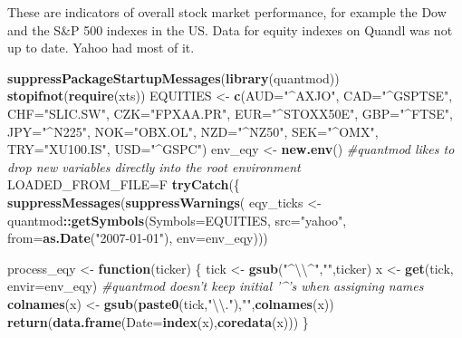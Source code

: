 \documentclass[]{article}
\newenvironment{Shaded}{\begin{snugshade}}{\end{snugshade}}
\newcommand{\KeywordTok}[1]{\textcolor[rgb]{0.13,0.29,0.53}{\textbf{#1}}}
\newcommand{\DataTypeTok}[1]{\textcolor[rgb]{0.13,0.29,0.53}{#1}}
\newcommand{\CharTok}[1]{\textcolor[rgb]{0.31,0.60,0.02}{#1}}
\newcommand{\StringTok}[1]{\textcolor[rgb]{0.31,0.60,0.02}{#1}}
\newcommand{\CommentTok}[1]{\textcolor[rgb]{0.56,0.35,0.01}{\textit{#1}}}
\newcommand{\ControlFlowTok}[1]{\textcolor[rgb]{0.13,0.29,0.53}{\textbf{#1}}}
\newcommand{\OperatorTok}[1]{\textcolor[rgb]{0.81,0.36,0.00}{\textbf{#1}}}
\newcommand{\NormalTok}[1]{#1}
\begin{document}
These are indicators of overall stock market performance, for example
the Dow and the S\&P 500 indexes in the US. Data for equity indexes on
Quandl was not up to date. Yahoo had most of it.

\begin{Shaded}
\begin{Highlighting}[]
\KeywordTok{suppressPackageStartupMessages}\NormalTok{(}\KeywordTok{library}\NormalTok{(quantmod))}
\KeywordTok{stopifnot}\NormalTok{(}\KeywordTok{require}\NormalTok{(xts))}
\NormalTok{EQUITIES <-}\StringTok{ }\KeywordTok{c}\NormalTok{(}\DataTypeTok{AUD=}\StringTok{"^AXJO"}\NormalTok{, }\DataTypeTok{CAD=}\StringTok{"^GSPTSE"}\NormalTok{, }\DataTypeTok{CHF=}\StringTok{"SLIC.SW"}\NormalTok{, }\DataTypeTok{CZK=}\StringTok{"FPXAA.PR"}\NormalTok{, }\DataTypeTok{EUR=}\StringTok{"^STOXX50E"}\NormalTok{,}
              \DataTypeTok{GBP=}\StringTok{"^FTSE"}\NormalTok{, }\DataTypeTok{JPY=}\StringTok{"^N225"}\NormalTok{, }\DataTypeTok{NOK=}\StringTok{"OBX.OL"}\NormalTok{, }\DataTypeTok{NZD=}\StringTok{"^NZ50"}\NormalTok{, }\DataTypeTok{SEK=}\StringTok{"^OMX"}\NormalTok{,}
              \DataTypeTok{TRY=}\StringTok{"XU100.IS"}\NormalTok{, }\DataTypeTok{USD=}\StringTok{"^GSPC"}\NormalTok{)}
\NormalTok{env_eqy <-}\StringTok{ }\KeywordTok{new.env}\NormalTok{() }\CommentTok{#quantmod likes to drop new variables directly into the root environment}
\NormalTok{LOADED_FROM_FILE=F}
\KeywordTok{tryCatch}\NormalTok{(\{}
  \KeywordTok{suppressMessages}\NormalTok{(}\KeywordTok{suppressWarnings}\NormalTok{(}
\NormalTok{    eqy_ticks <-}\StringTok{ }\NormalTok{quantmod}\OperatorTok{::}\KeywordTok{getSymbols}\NormalTok{(}\DataTypeTok{Symbols=}\NormalTok{EQUITIES, }\DataTypeTok{src=}\StringTok{"yahoo"}\NormalTok{, }
                               \DataTypeTok{from=}\KeywordTok{as.Date}\NormalTok{(}\StringTok{"2007-01-01"}\NormalTok{), }\DataTypeTok{env=}\NormalTok{env_eqy)))}
  
\NormalTok{  process_eqy <-}\StringTok{ }\ControlFlowTok{function}\NormalTok{(ticker) \{ }
\NormalTok{    tick <-}\StringTok{ }\KeywordTok{gsub}\NormalTok{(}\StringTok{"^}\CharTok{\textbackslash{}\textbackslash{}}\StringTok{^"}\NormalTok{,}\StringTok{""}\NormalTok{,ticker)}
\NormalTok{    x <-}\StringTok{ }\KeywordTok{get}\NormalTok{(tick, }\DataTypeTok{envir=}\NormalTok{env_eqy) }\CommentTok{#quantmod doesn't keep initial '^'s when assigning names}
    \KeywordTok{colnames}\NormalTok{(x) <-}\StringTok{ }\KeywordTok{gsub}\NormalTok{(}\KeywordTok{paste0}\NormalTok{(tick,}\StringTok{"}\CharTok{\textbackslash{}\textbackslash{}}\StringTok{."}\NormalTok{),}\StringTok{""}\NormalTok{,}\KeywordTok{colnames}\NormalTok{(x))}
    \KeywordTok{return}\NormalTok{(}\KeywordTok{data.frame}\NormalTok{(}\DataTypeTok{Date=}\KeywordTok{index}\NormalTok{(x),}\KeywordTok{coredata}\NormalTok{(x)))}
\NormalTok{  \}}
  

\end{Highlighting}
\end{Shaded}
\end{document}
